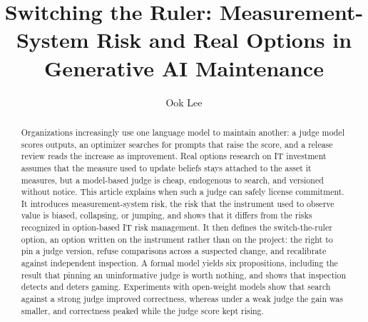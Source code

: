 \documentclass[acmsmall,screen,review,anonymous]{acmart}
\theoremstyle{acmdefinition}
\begin{document}
\title[Switching the Ruler]{Switching the Ruler: Measurement-System Risk and Real Options in Generative AI Maintenance}

\author{Ook Lee}

\renewcommand{\shortauthors}{Ook Lee}

\begin{abstract}
Organizations increasingly use one language model to maintain another: a judge model scores outputs, an optimizer searches for prompts that raise the score, and a release review reads the increase as improvement. Real options research on IT investment assumes that the measure used to update beliefs stays attached to the asset it measures, but a model-based judge is cheap, endogenous to search, and versioned without notice. This article explains when such a judge can safely license commitment. It introduces measurement-system risk, the risk that the instrument used to observe value is biased, collapsing, or jumping, and shows that it differs from the risks recognized in option-based IT risk management. It then defines the switch-the-ruler option, an option written on the instrument rather than on the project: the right to pin a judge version, refuse comparisons across a suspected change, and recalibrate against independent inspection. A formal model yields six propositions, including the result that pinning an uninformative judge is worth nothing, and shows that inspection detects and deters gaming. Experiments with open-weight models show that search against a strong judge improved correctness, whereas under a weak judge the gain was smaller, and correctness peaked while the judge score kept rising.
\end{abstract}

\begin{CCSXML}
\end{CCSXML}



\maketitle
\end{document}
